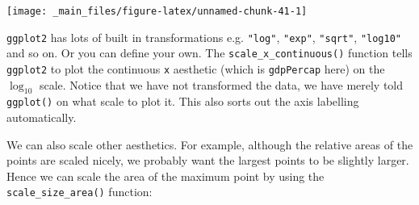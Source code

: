 \documentclass[]{book}
\newenvironment{Shaded}{\begin{snugshade}}{\end{snugshade}}
\newcommand{\KeywordTok}[1]{\textcolor[rgb]{0.13,0.29,0.53}{\textbf{{#1}}}}
\newcommand{\DataTypeTok}[1]{\textcolor[rgb]{0.13,0.29,0.53}{{#1}}}
\newcommand{\DecValTok}[1]{\textcolor[rgb]{0.00,0.00,0.81}{{#1}}}
\newcommand{\StringTok}[1]{\textcolor[rgb]{0.31,0.60,0.02}{{#1}}}
\newcommand{\NormalTok}[1]{{#1}}
\theoremstyle{definition}
\theoremstyle{definition}
\theoremstyle{definition}
\theoremstyle{remark}
\begin{document}
\begin{Shaded}
\end{Shaded}

\begin{center}\texttt{[image: \_main\_files/figure-latex/unnamed-chunk-41-1]} \end{center}

\texttt{ggplot2} has lots of built in transformations e.g.
\texttt{"log"}, \texttt{"exp"}, \texttt{"sqrt"}, \texttt{"log10"} and so
on. Or you can define your own. The \texttt{scale\_x\_continuous()}
function tells \texttt{ggplot2} to plot the continuous \texttt{x}
aesthetic (which is \texttt{gdpPercap} here) on the \(\log_{10}\) scale.
Notice that we have not transformed the data, we have merely told
\texttt{ggplot()} on what scale to plot it. This also sorts out the axis
labelling automatically.

We can also scale other aesthetics. For example, although the relative
areas of the points are scaled nicely, we probably want the largest
points to be slightly larger. Hence we can scale the area of the maximum
point by using the \texttt{scale\_size\_area()} function:

\begin{Shaded}
\end{Shaded}
\end{document}
